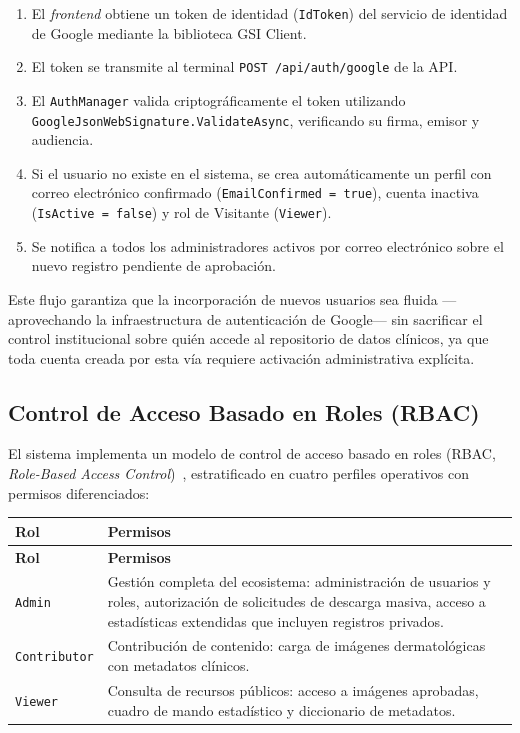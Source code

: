 \begin{enumerate}
    \item El \textit{frontend} obtiene un token de identidad (\texttt{IdToken}) del servicio de identidad de 
    Google mediante la biblioteca GSI Client.
    \item El token se transmite al terminal \texttt{POST /api/auth/google} de la API.
    \item El \texttt{AuthManager} valida criptográficamente el token utilizando 
    \texttt{GoogleJsonWebSignature.ValidateAsync}, verificando su firma, emisor y audiencia.
    \item Si el usuario no existe en el sistema, se crea automáticamente un perfil con correo electrónico 
    confirmado (\texttt{EmailConfirmed = true}), cuenta inactiva (\texttt{IsActive = false}) y rol de 
    Visitante (\texttt{Viewer}).
    \item Se notifica a todos los administradores activos por correo electrónico sobre el nuevo registro 
    pendiente de aprobación.
\end{enumerate}

Este flujo garantiza que la incorporación de nuevos usuarios sea fluida ---aprovechando la infraestructura 
de autenticación de Google--- sin sacrificar el control institucional sobre quién accede al 
repositorio de datos clínicos, ya que toda cuenta creada por esta vía requiere activación administrativa 
explícita.

\subsection{Control de Acceso Basado en Roles (RBAC)}
El sistema implementa un modelo de control de acceso basado en roles 
(RBAC, \textit{Role-Based Access Control})~\cite{nist_rbac}, estratificado en cuatro perfiles operativos 
con permisos diferenciados:

\begin{longtable}{|p{3cm}|p{11.5cm}|}
\hline
\textbf{Rol} & \textbf{Permisos} \\
\hline
\endfirsthead
\hline
\textbf{Rol} & \textbf{Permisos} \\
\hline
\endhead
\texttt{Admin} & Gestión completa del ecosistema: administración de usuarios y roles, autorización de 
solicitudes de descarga masiva, acceso a estadísticas extendidas que incluyen registros privados. \\
\hline
\texttt{Contributor} & Contribución de contenido: carga de imágenes dermatológicas con metadatos clínicos. \\
\hline
\texttt{Viewer} & Consulta de recursos públicos: acceso a imágenes aprobadas, cuadro de mando estadístico 
y diccionario de metadatos. \\
\hline
\end{longtable}

